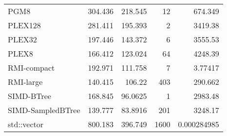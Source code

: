 \begin{tabular}{lrrrr}
 PGM8              &                304.436 &              218.545  &           12 &    674.349       \\
 PLEX128           &                281.411 &              195.393  &            2 &   3419.38        \\
 PLEX32            &                197.446 &              143.372  &            6 &   3555.53        \\
 PLEX8             &                166.412 &              123.024  &           64 &   4248.39        \\
 RMI-compact       &                192.971 &              111.758  &            7 &      3.77417     \\
 RMI-large         &                140.415 &              106.22   &          403 &    290.662       \\
 SIMD-BTree        &                168.845 &               96.0625 &            1 &   2983.48        \\
 SIMD-SampledBTree &                139.777 &               83.8916 &          201 &   3248.17        \\
 std::vector       &                800.183 &              396.749  &         1600 &      0.000284985 \\
\hline
\end{tabular}